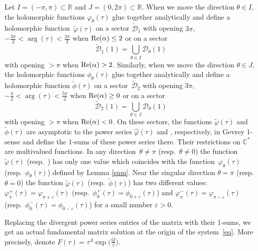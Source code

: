 \documentclass[10pt,a4paper]{amsart}
\numberwithin{equation}{section}
\begin{document}
 \begin{Remark}\label{sum1}
 Let $I =(-\pi, \pi) \subset \mathbb{R}$ and $J=(0, 2 \pi) \subset \mathbb{R}$. When we move the direction $\theta\in I$, the
 holomorphic functions $\varphi_{\theta}(\tau)$ glue together analytically and define a holomorphic function~$\tilde{\varphi}(\tau)$ on a sector $\widetilde{\mathcal{D}}_1$ with opening
 $3 \pi$, $-\frac{3 \pi}{2} < \arg (\tau) < \frac{3 \pi}{2}$ when ${\rm Re}(\alpha) \leq 2$ or on a sector
 \[
 \widetilde{\mathcal{D}}_1(1)=\bigcup _{\theta\in I} \mathcal{D}_{\theta}(1)
 \]
 with opening $> \pi$ when ${\rm Re}(\alpha) > 2$.
 Similarly, when we move the direction $\theta\in J$, the
 holomorphic functions $\phi_{\theta}(\tau)$ glue together analytically and define a holomorphic function
 $\tilde{\phi}(\tau)$ on a sector~$\widetilde{\mathcal{D}}_2$ with opening
 $3 \pi$, $-\frac{\pi}{2} < \arg (\tau) < \frac{5 \pi}{2}$ when ${\rm Re}(\alpha) \geq 0$ or on a sector
 \[
 \widetilde{\mathcal{D}}_2(1)=\bigcup _{\theta\in J} \mathcal{D}_{\theta}(1)
 \]
 with opening $> \pi$ when ${\rm Re}(\alpha) < 0$. On these sectors, the functions $\tilde{\varphi}(\tau)$ and
 $\tilde{\phi}(\tau)$ are asymptotic to the power series $\hat{\varphi}(\tau)$ and \smash{$\hat{\phi}(\tau)$}, respectively,
 in Gevrey 1-sense and define the 1-sums of these power series there. Their restrictions on $\mathbb{C}^*$ are multivalued
 functions. In any direction~${\theta\neq \pi}$ (resp.\ $\theta\neq 0$) the function $\tilde{\varphi}(\tau)$
 \big(resp.\ \smash{$\tilde{\phi}(\tau)$}\big) has only one value which coincides with the function~$\varphi_{\theta}(\tau)$
 (resp.\ $\phi_{\theta}(\tau)$) defined by Lemma \ref{sum}. Near the singular direction $\theta=\pi$
 (resp.\ $\theta=0$) the function $\tilde{\varphi}(\tau)$ \big(resp.\ $\tilde{\phi}(\tau)$\big) has two different values:
 $\varphi^{+}_{\pi}(\tau)=\varphi_{\pi+\varepsilon}(\tau)$
 \big(resp.~${\phi^{+}_{0}(\tau)=\phi_{0+\varepsilon}(\tau)}$\big) and $\varphi^{-}_{\pi}(\tau)=\varphi_{\pi-\varepsilon}(\tau)$
 (resp.\ $\phi^{-}_{0}(\tau)=\phi_{0-\varepsilon}(\tau)$) for a small number $\varepsilon>0$.

 \end{Remark}

 Replacing the divergent power series entries of the matrix  with their 1-sums, we get an actual fundamental
 matrix solution at the origin of the system~\eqref{eq}. More precisely,
 denote $F(\tau)=\tau^{\Lambda} \exp\bigl(\frac{Q}{\tau}\bigr)$.
\end{document}
